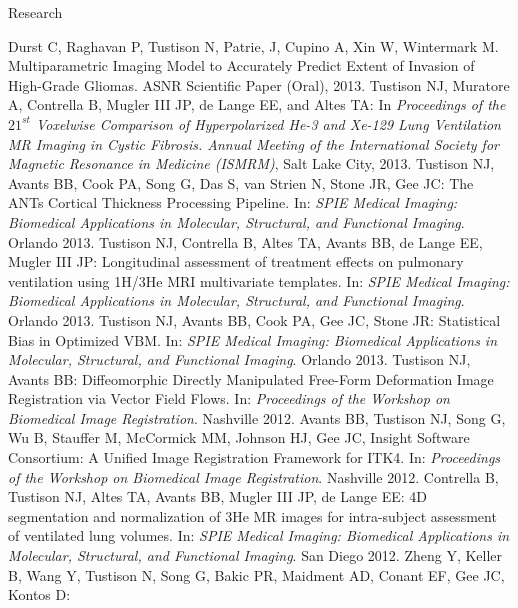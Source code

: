 \documentclass{resume}
\begin{document}
\begin{category}{Research}

   \begin{itemize}
   \citemnobullet Durst C, Raghavan P, Tustison N, Patrie, J, Cupino A, Xin W, Wintermark M. Multiparametric Imaging Model to Accurately Predict Extent of Invasion of High-Grade Gliomas. ASNR Scientific Paper (Oral), 2013.
   \citemnobullet Tustison NJ, Muratore A, Contrella B, Mugler III JP, de Lange EE, and Altes TA:  
   In {\em Proceedings of the $21^{st}$ Voxelwise Comparison of Hyperpolarized He-3 and Xe-129 Lung Ventilation MR Imaging in Cystic Fibrosis.  Annual Meeting of the International Society for Magnetic Resonance in Medicine (ISMRM)}, Salt Lake City, 2013.
   \citemnobullet Tustison NJ, Avants BB, Cook PA, Song G, Das S, van Strien N, Stone JR,
   Gee JC:  The ANTs Cortical Thickness Processing Pipeline.  
   In: {\em SPIE Medical Imaging: Biomedical Applications in Molecular, Structural, and 
   Functional Imaging}. Orlando 2013.
   \citemnobullet Tustison NJ, Contrella B, Altes TA, Avants BB, de Lange EE, Mugler III JP:  
   Longitudinal assessment of treatment effects on pulmonary ventilation using 1H/3He MRI 
   multivariate templates.
   In: {\em SPIE Medical Imaging: Biomedical Applications in Molecular, Structural, and 
   Functional Imaging}. Orlando 2013.
   \citemnobullet Tustison NJ, Avants BB, Cook PA, Gee JC, Stone JR:  
   Statistical Bias in Optimized VBM.
   In: {\em SPIE Medical Imaging: Biomedical Applications in Molecular, Structural, and 
   Functional Imaging}. Orlando 2013.
   \citemnobullet Tustison NJ, Avants BB:  Diffeomorphic Directly Manipulated Free-Form Deformation Image   
   Registration via Vector Field Flows.  In:  {\em Proceedings of the Workshop on Biomedical Image 
   Registration}.  Nashville 2012.
   \citemnobullet Avants BB, Tustison NJ, Song G, Wu B, Stauffer M, McCormick MM, Johnson HJ, Gee JC, Insight Software Consortium:  A Unified Image Registration Framework 
   for ITK4.  In:  {\em Proceedings of the Workshop on Biomedical Image 
   Registration}.  Nashville 2012.
   \citemnobullet Contrella B, Tustison NJ, Altes TA, Avants BB, Mugler III JP, de Lange EE: 
   4D segmentation and normalization of 3He MR images for intra-subject assessment of ventilated lung
   volumes. In: {\em SPIE Medical Imaging: Biomedical Applications in Molecular, Structural, and 
   Functional Imaging}. San Diego 2012.   
   \citemnobullet 
   Zheng Y, Keller B, Wang Y, Tustison N, Song G, Bakic PR, Maidment AD, Conant EF, Gee JC, Kontos D:

\end{itemize}
\end{category}
\end{document}
